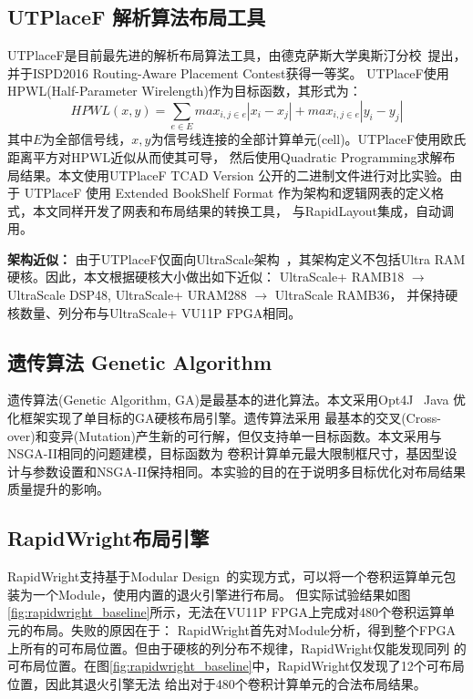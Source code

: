 \subsection{UTPlaceF 解析算法布局工具}

UTPlaceF是目前最先进的解析布局算法工具，由德克萨斯大学奥斯汀分校~\cite{li2017utplacef}提出，并于ISPD2016 Routing-Aware Placement Contest获得一等奖。
UTPlaceF使用HPWL(Half-Parameter Wirelength)作为目标函数，其形式为：
$$ HPWL(x,y) = \sum_{e \in E} {max_{i,j \in e} |x_i-x_j| + max_{i,j \in e} |y_i-y_j|} $$
其中$E$为全部信号线，$x, y$为信号线连接的全部计算单元(cell)。UTPlaceF使用欧氏距离平方对HPWL近似从而使其可导，
然后使用Quadratic Programming求解布局结果。本文使用UTPlaceF TCAD Version 公开的二进制文件进行对比实验。由于
UTPlaceF 使用 Extended BookShelf Format 作为架构和逻辑网表的定义格式，本文同样开发了网表和布局结果的转换工具，
与RapidLayout集成，自动调用。

{\bf 架构近似：} 由于UTPlaceF仅面向UltraScale架构~\cite{li2017utplacef}，其架构定义不包括Ultra RAM硬核。因此，本文根据硬核大小做出如下近似：
UltraScale+ RAMB18 $\rightarrow$ UltraScale DSP48, 
UltraScale+ URAM288 $\rightarrow$ UltraScale RAMB36，
并保持硬核数量、列分布与UltraScale+ VU11P FPGA相同。

\subsection{遗传算法 Genetic Algorithm}

遗传算法(Genetic Algorithm, GA)是最基本的进化算法。本文采用Opt4J~\cite{opt4jpaper} Java 优化框架实现了单目标的GA硬核布局引擎。遗传算法采用
最基本的交叉(Cross-over)和变异(Mutation)产生新的可行解，但仅支持单一目标函数。本文采用与NSGA-II相同的问题建模，目标函数为
卷积计算单元最大限制框尺寸，基因型设计与参数设置和NSGA-II保持相同。本实验的目的在于说明多目标优化对布局结果质量提升的影响。

\subsection{RapidWright布局引擎}

RapidWright支持基于Modular Design~\cite{lavin2018rapidwright}的实现方式，可以将一个卷积运算单元包装为一个Module，使用内置的退火引擎进行布局。
但实际试验结果如图\ref{fig:rapidwright_baseline}所示，无法在VU11P FPGA上完成对480个卷积运算单元的布局。失败的原因在于：
RapidWright首先对Module分析，得到整个FPGA上所有的可布局位置。但由于硬核的列分布不规律，RapidWright仅能发现同列
的可布局位置。在图\ref{fig:rapidwright_baseline}中，RapidWright仅发现了12个可布局位置，因此其退火引擎无法
给出对于480个卷积计算单元的合法布局结果。

